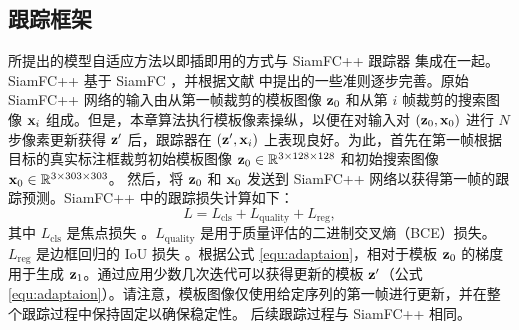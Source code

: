 \subsection{跟踪框架}
所提出的模型自适应方法以即插即用的方式与 SiamFC++ 跟踪器 \cite{SiamFC++} 集成在一起。 SiamFC++ 基于 SiamFC \cite{SiamFC}，并根据文献 \cite{SiamFC++} 中提出的一些准则逐步完善。原始 SiamFC++ 网络的输入由从第一帧裁剪的模板图像 $\textbf z_0$ 和从第 $i$ 帧裁剪的搜索图像 $\textbf x_i$ 组成。但是，本章算法执行模板像素操纵，以便在对输入对 $(\textbf z_0, \textbf x_0)$ 进行 $N$ 步像素更新获得 $\textbf z'$ 后，跟踪器在 $(\textbf z', \textbf x_i)$ 上表现良好。为此，首先在第一帧根据目标的真实标注框裁剪初始模板图像 $\textbf z_0\in\mathbb R^{3\times128\times 128}$ 和初始搜索图像 $\textbf x_0\in\mathbb R^{3\times303\times 303}$。
然后，将 $\textbf z_0$ 和 $\textbf x_0$ 发送到 SiamFC++ 网络以获得第一帧的跟踪预测。SiamFC++ \cite{SiamFC++} 中的跟踪损失计算如下：
\begin{equation}
    L = L_{\text{cls}} + L_{\text{quality}} + L_{\text{reg}},
\end{equation}
其中 $L_{\text{cls}}$ 是焦点损失 \cite{focal}。$L_{\text{quality}}$ 是用于质量评估的二进制交叉熵（BCE）损失。$L_{\text{reg}}$ 是边框回归的 IoU 损失 \cite{yu2016unitbox}。根据公式 \ref{equ:adaptaion}，相对于模板 $\textbf z_0$ 的梯度用于生成 $\textbf z_1$。通过应用少数几次迭代可以获得更新的模板 $\textbf z'$（公式 \ref{equ:adaptaion}）。请注意，模板图像仅使用给定序列的第一帧进行更新，并在整个跟踪过程中保持固定以确保稳定性。
后续跟踪过程与 SiamFC++ 相同。

